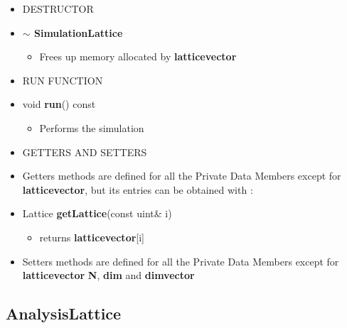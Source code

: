 \begin{itemize}
\begin{itemize}
		\item[] DESTRUCTOR \\
		
			\item[] \textbf{$\sim$ SimulationLattice}	 
			\begin{itemize}
				\item[] Frees up memory allocated by \textbf{lattice\textunderscore vector}  \\
			\end{itemize}
			
		\item[] RUN FUNCTION \\
			
			\item[] void \textbf{run}() const		 
			\begin{itemize}
				\item[] Performs the simulation \\  
			\end{itemize}
						
		
		\item[] GETTERS AND SETTERS \\
 			
 			\item[] Getters methods are defined for all the Private Data Members except for \textbf{lattice\textunderscore vector}, but its entries can be obtained with : 
 			  
 			\item[] Lattice \textbf{getLattice}(const uint\& i)		 
			\begin{itemize}
				\item[] returns \textbf{lattice\textunderscore vector}[i]  
			\end{itemize}
 					
 			\item[] Setters methods are defined for all the Private Data Members except for \textbf{lattice\textunderscore vector} \textbf{N}, \textbf{dim} and \textbf{dim\textunderscore vector}   
 			 		
	\end{itemize}

	
\end{itemize}


\subsection*{AnalysisLattice}

